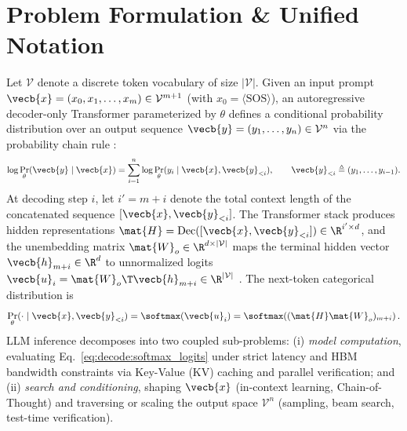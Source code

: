\documentclass[../../../../master.tex]{subfiles}
\begin{document}

\section{Problem Formulation \& Unified Notation}\label{sec:decode:formulation}

Let $\mathcal{V}$ denote a discrete token vocabulary of size $|\mathcal{V}|$. Given an input prompt $\vecb{x} = (x_0, x_1, \dots, x_m) \in \mathcal{V}^{m+1}$ (with $x_0 = \langle\mathrm{SOS}\rangle$), an autoregressive decoder-only Transformer parameterized by $\theta$ defines a conditional probability distribution over an output sequence $\vecb{y} = (y_1, \dots, y_n) \in \mathcal{V}^n$ via the probability chain rule :
\begin{equation}\label{eq:decode:autoregressive_factorization}
  \log \Pr_{\theta}(\vecb{y} \mid \vecb{x})
  = \sum_{i=1}^{n} \log \Pr_{\theta}(y_i \mid \vecb{x}, \vecb{y}_{<i}),
  \qquad \vecb{y}_{<i} \triangleq (y_1, \dots, y_{i-1}).
\end{equation}
At decoding step $i$, let $i' = m + i$ denote the total context length of the concatenated sequence $[\vecb{x}, \vecb{y}_{<i}]$. The Transformer stack produces hidden representations $\mat{H} = \mathrm{Dec}([\vecb{x}, \vecb{y}_{<i}]) \in \R^{i' \times d}$, and the unembedding matrix $\mat{W}_o \in \R^{d \times |\mathcal{V}|}$ maps the terminal hidden vector $\vecb{h}_{m+i} \in \R^d$ to unnormalized logits $\vecb{u}_{i} = \mat{W}_o\T \vecb{h}_{m+i} \in \R^{|\mathcal{V}|}$ . The next-token categorical distribution is
\begin{equation}\label{eq:decode:softmax_logits}
  \Pr_{\theta}(\cdot \mid \vecb{x}, \vecb{y}_{<i})
  = \softmax(\vecb{u}_i)
  = \softmax\!\left((\mat{H}\mat{W}_o)_{m+i}\right).
\end{equation}
LLM inference decomposes into two coupled sub-problems: (i) \emph{model computation}, evaluating Eq.~\eqref{eq:decode:softmax_logits} under strict latency and HBM bandwidth constraints via Key-Value (KV) caching and parallel verification; and (ii) \emph{search and conditioning}, shaping $\vecb{x}$ (in-context learning, Chain-of-Thought) and traversing or scaling the output space $\mathcal{V}^n$ (sampling, beam search, test-time verification).
\end{document}
